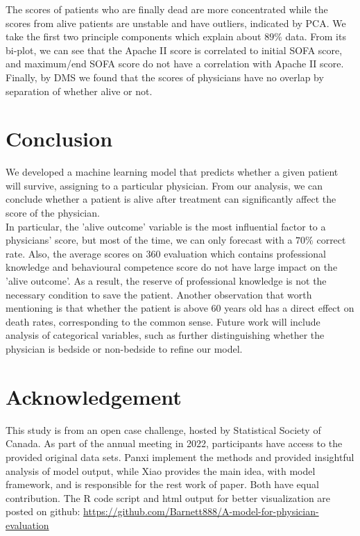 \documentclass{article}
\begin{document}
The scores of patients who are finally dead are more concentrated while the scores from alive patients are unstable and have outliers, indicated by PCA. We take the first two principle components which explain about $89\%$ data. From its bi-plot, we can see that the Apache II score is correlated to initial SOFA score, and maximum/end SOFA score do not have a correlation with Apache II score. Finally, by DMS we found that the scores of physicians have no overlap by separation of whether alive or not.

\section{Conclusion}

We developed a machine learning model that predicts whether a given patient will survive, assigning to a particular physician. From our analysis, we can conclude whether a patient is alive after treatment can significantly affect the score of the physician.\\

In particular, the 'alive outcome' variable is the most influential factor to a physicians' score, but most of the time, we can only forecast with a $70\%$ correct rate. Also, the average scores on 360 evaluation which contains professional knowledge and behavioural competence score do not have large impact on the 'alive outcome'. As a result, the reserve of professional knowledge is not the necessary condition to save the patient. Another observation that worth mentioning is that whether the patient is above 60 years old has a direct effect on death rates, corresponding to the common sense. Future work will include analysis of categorical variables, such as further distinguishing whether the physician is bedside or non-bedside to refine our model.

\section{Acknowledgement}

This study is from an open case challenge, hosted by Statistical Society of Canada. As part of the annual meeting in 2022, participants have access to the provided original data sets. Panxi implement the methods and provided insightful analysis of model output, while Xiao provides the main idea, with model framework, and is responsible for the rest work of paper. Both have equal contribution. The R code script and html output for better visualization are posted on github: \url{https://github.com/Barnett888/A-model-for-physician-evaluation}

\bigskip
\bigskip
\bigskip
\bigskip
\bigskip
\bigskip
\bigskip
\bigskip
\bigskip
\bigskip
\bigskip
\bigskip
\bigskip
\bigskip
\bigskip
\bigskip
\bigskip
\bigskip
\bigskip





{}

\end{document}
